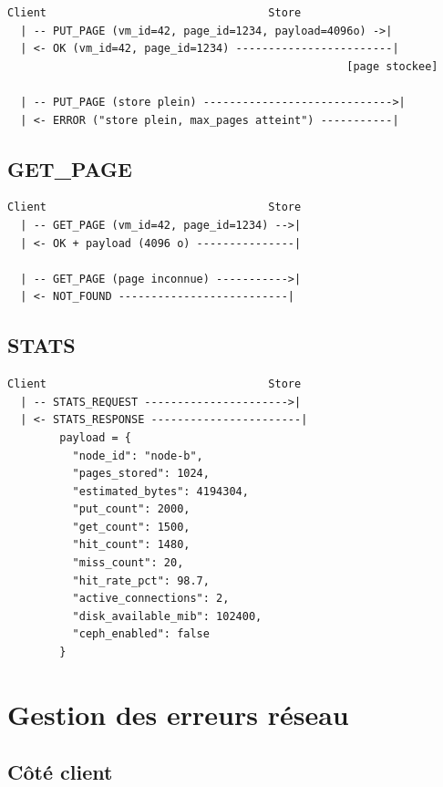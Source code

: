 \begin{lstlisting}[basicstyle=\ttfamily\footnotesize, frame=single]
Client                                  Store
  | -- PUT_PAGE (vm_id=42, page_id=1234, payload=4096o) ->|
  | <- OK (vm_id=42, page_id=1234) ------------------------|
                                                    [page stockee]

  | -- PUT_PAGE (store plein) ----------------------------->|
  | <- ERROR ("store plein, max_pages atteint") -----------|
\end{lstlisting}

\subsection{GET\_PAGE}

\begin{lstlisting}[basicstyle=\ttfamily\footnotesize, frame=single]
Client                                  Store
  | -- GET_PAGE (vm_id=42, page_id=1234) -->|
  | <- OK + payload (4096 o) ---------------|

  | -- GET_PAGE (page inconnue) ----------->|
  | <- NOT_FOUND --------------------------|
\end{lstlisting}

\subsection{STATS}

\begin{lstlisting}[basicstyle=\ttfamily\footnotesize, frame=single]
Client                                  Store
  | -- STATS_REQUEST ---------------------->|
  | <- STATS_RESPONSE -----------------------|
        payload = {
          "node_id": "node-b",
          "pages_stored": 1024,
          "estimated_bytes": 4194304,
          "put_count": 2000,
          "get_count": 1500,
          "hit_count": 1480,
          "miss_count": 20,
          "hit_rate_pct": 98.7,
          "active_connections": 2,
          "disk_available_mib": 102400,
          "ceph_enabled": false
        }
\end{lstlisting}

\section{Gestion des erreurs réseau}

\subsection{Côté client}


